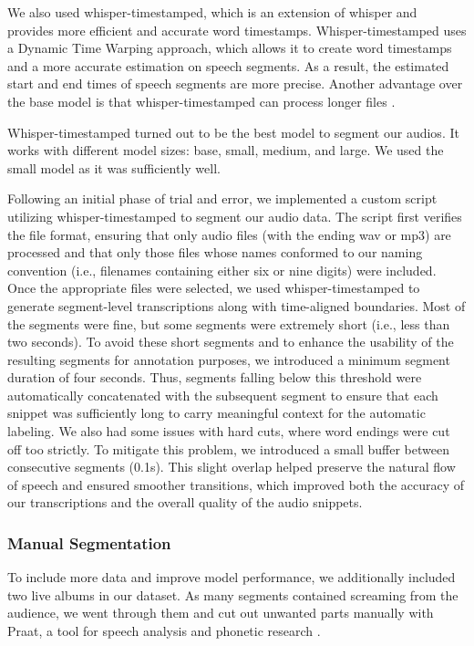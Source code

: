 \documentclass[a4paper]{article}
\begin{document}
	We also used whisper-timestamped, which is an extension of whisper and provides more efficient and accurate word timestamps. Whisper-timestamped uses a Dynamic Time Warping approach, which allows it to create word timestamps and a more accurate estimation on speech segments. As a result, the estimated start and end times of speech segments are more precise. Another advantage over the base model is that whisper-timestamped can process longer files \cite{Andreyev2025}.
	
	Whisper-timestamped turned out to be the best model to segment our audios. It works with different model sizes: base, small, medium, and large. We used the small model as it was sufficiently well.
	
	Following an initial phase of trial and error, we implemented a custom script utilizing whisper-timestamped to segment our audio data. The script first verifies the file format, ensuring that only audio files (with the ending wav or mp3) are processed and that only those files whose names conformed to our naming convention (i.e., filenames containing either six or nine digits) were included. Once the appropriate files were selected, we used whisper-timestamped to generate segment-level transcriptions along with time-aligned boundaries. Most of the segments were fine, but some segments were extremely short (i.e., less than two seconds). To avoid these short segments and to enhance the usability of the resulting segments for annotation purposes, we introduced a minimum segment duration of four seconds. Thus, segments falling below this threshold were automatically concatenated with the subsequent segment to ensure that each snippet was sufficiently long to carry meaningful context for the automatic labeling. We also had some issues with hard cuts, where word endings were cut off too strictly. To mitigate this problem, we introduced a small buffer between consecutive segments (0.1s). This slight overlap helped preserve the natural flow of speech and ensured smoother transitions, which improved both the accuracy of our transcriptions and the overall quality of the audio snippets.
	
	
	\subsubsection{Manual Segmentation}
	
	To include more data and improve model performance, we additionally included two live albums in our dataset. As many segments contained screaming from the audience, we went through them and cut out unwanted parts manually with Praat, a tool for speech analysis and phonetic research \cite{BoersmaND}.
	
\end{document}
